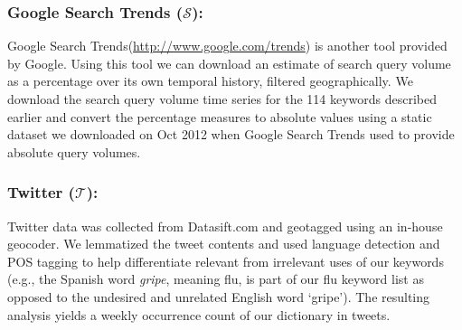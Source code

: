 \vspace{-1em}
\subsubsection{Google Search Trends ($\mathcal{S}$):} 
Google Search Trends(\url{http://www.google.com/trends}) is
another tool provided by Google. Using this tool we can download an estimate of
search query volume as a percentage over its own temporal history, filtered
geographically. We download
the search query volume time series for the 114 keywords described earlier
and convert the percentage measures to
absolute values using a static dataset we downloaded on Oct 2012 when Google
Search Trends used to provide absolute query volumes. 

\vspace{-1em}
\subsubsection{Twitter ($\mathcal{T}$):} 
Twitter data was collected from Datasift.com
and geotagged using an in-house geocoder. We lemmatized the tweet
contents and used language detection and POS tagging to help differentiate relevant
from irrelevant uses of our keywords 
(e.g., the Spanish word
{\it gripe}, meaning flu, is part of our flu keyword list as opposed to the undesired
and unrelated English word `gripe'). The resulting analysis yields a weekly occurrence
count of our dictionary in tweets.
%

\vspace{-1em}
